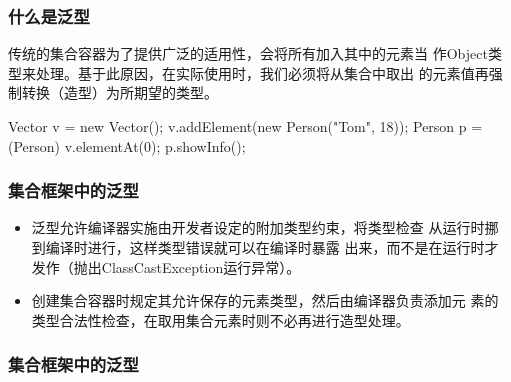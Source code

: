 \begin{frame}[fragile] 
  \frametitle{什么是泛型}


  传统的集合容器为了提供广泛的适用性，会将所有加入其中的元素当
  作Object类型来处理。基于此原因，在实际使用时，我们必须将从集合中取出
  的元素值再强制转换（造型）为所期望的类型。

  \pause
  
  
  \begin{javaCode}
    Vector v = new Vector();
    v.addElement(new Person("Tom", 18));
    Person p = (Person) v.elementAt(0);
    p.showInfo();
  \end{javaCode}
  
\end{frame}

\begin{frame}[fragile]
  \frametitle{集合框架中的泛型}

  \begin{itemize}[<+-|alert@+>]
  \item 泛型允许编译器实施由开发者设定的附加类型约束，将类型检查
    从{\hei\Blue 运行时挪到编译时}进行，这样类型错误就可以在编译时暴露
    出来，而不是在运行时才发作（抛出ClassCastException运行异常）。
  \item 创建集合容器时规定其允许保存的元素类型，然后由编译器负责添加元
    素的类型合法性检查，在取用集合元素时则不必再进行造型处理。
  \end{itemize}
\end{frame}

\begin{frame}[fragile]
  \frametitle{集合框架中的泛型}


  

  
\end{frame}

